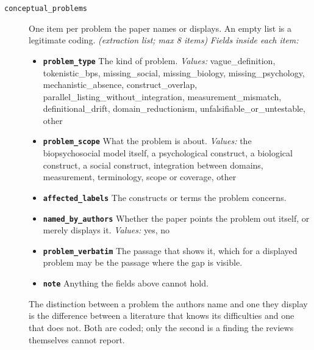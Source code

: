 \documentclass[11pt]{article}
\begin{document}
\begin{description}
\item[\texttt{conceptual\_problems}] One item per problem the paper names or displays. An empty list is a legitimate coding. \textit{(extraction list; max 8 items)}
  {\small\itshape Fields inside each item:}
  \begin{itemize}[leftmargin=1.3em,itemsep=1pt,topsep=2pt]
  \item \textbf{\texttt{problem\_type}} The kind of problem. {\small \textit{Values:} vague\_definition, tokenistic\_bps, missing\_social, missing\_biology, missing\_psychology, mechanistic\_absence, construct\_overlap, parallel\_listing\_without\_integration, measurement\_mismatch, definitional\_drift, domain\_reductionism, unfalsifiable\_or\_untestable, other}
  \item \textbf{\texttt{problem\_scope}} What the problem is about. {\small \textit{Values:} the biopsychosocial model itself, a psychological construct, a biological construct, a social construct, integration between domains, measurement, terminology, scope or coverage, other}
  \item \textbf{\texttt{affected\_labels}} The constructs or terms the problem concerns.
  \item \textbf{\texttt{named\_by\_authors}} Whether the paper points the problem out itself, or merely displays it. {\small \textit{Values:} yes, no}
  \item \textbf{\texttt{problem\_verbatim}} The passage that shows it, which for a displayed problem may be the passage where the gap is visible.
  \item \textbf{\texttt{note}} Anything the fields above cannot hold.
  \end{itemize}
{\small The distinction between a problem the authors name and one they display is the difference between a literature that knows its difficulties and one that does not. Both are coded; only the second is a finding the reviews themselves cannot report.}
\end{description}
\end{document}

